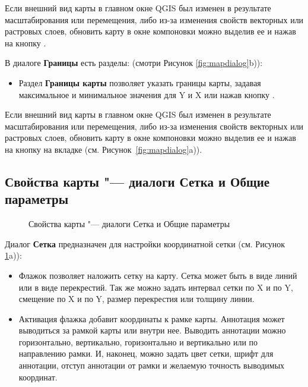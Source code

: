 Если внешний вид карты в главном окне QGIS был изменен в результате
масштабирования или перемещения, либо из-за изменения свойств векторных
или растровых слоев, обновить карту в окне компоновки можно выделив ее
и нажав на кнопку .


В диалоге \textbf{Границы} есть разделы:
(смотри Рисунок \ref{fig:mapdialog}b)):

\begin{itemize}[label=--]
\item Раздел \textbf{Границы карты} позволяет указать границы карты,
задавая максимальное и минимальное значения для Y и X или нажав кнопку
.
\end{itemize}

Если внешний вид карты в главном окне QGIS был изменен в результате
масштабирования или перемещения, либо из-за изменения свойств векторных
или растровых слоев, обновить карту в окне компоновки можно выделив ее
и нажав на кнопку  на вкладке  (см.
Рисунок~\ref{fig:mapdialog}a)).

\subsection{Свойства карты "--- диалоги Сетка и Общие параметры}

\begin{figure}[ht]
\centering
   \hspace{1cm}
   \caption{Свойства карты "--- диалоги Сетка и Общие параметры \nixcaption}\label{fig:sec_map_dialog}
\end{figure}


Диалог \textbf{Сетка} предназначен для настройки координатной сетки
(см. Рисунок \ref{fig:sec_map_dialog}a)):

\begin{itemize}[label=--]
\item Флажок  позволяет наложить сетку на
карту. Сетка может быть в виде линий или в виде перекрестий. Так же
можно задать интервал сетки по X и по Y, смещение по X и по Y, размер
перекрестия или толщину линии.
\item Активация флажка  добавит
координаты к рамке карты. Аннотация может выводиться за рамкой карты или
внутри нее. Выводить аннотации можно горизонтально, вертикально,
горизонтально и вертикально или по направлению рамки. И, наконец, можно
задать цвет сетки, шрифт для аннотации, отступ аннотации от рамки и
желаемую точность выводимых координат.
\end{itemize}

